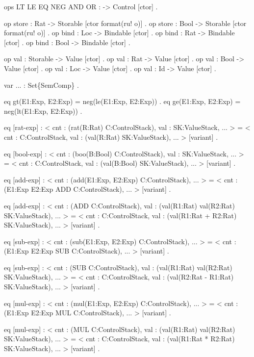 \documentclass{llncs}%
\begin{document}
    ops LT LE EQ NEG AND OR : -> Control [ctor] .

    op store : Rat -> Storable [ctor format(ru! o)] .
    op store : Bool -> Storable [ctor format(ru! o)] .
    op bind : Loc -> Bindable [ctor] .
    op bind : Rat -> Bindable [ctor] .
    op bind : Bool -> Bindable [ctor] .

    op val : Storable -> Value [ctor] .
    op val : Rat -> Value [ctor] .
    op val : Bool -> Value [ctor] .
    op val : Loc -> Value [ctor] .
    op val : Id -> Value [ctor] .

    var ... : Set\{SemComp\} .

    eq gt(E1:Exp, E2:Exp) = neg(le(E1:Exp, E2:Exp)) .
    eq ge(E1:Exp, E2:Exp) = neg(lt(E1:Exp, E2:Exp)) .

    eq [rat-exp] :
        < cnt : (rat(R:Rat) C:ControlStack), val : SK:ValueStack, ... > 
     =
        < cnt : C:ControlStack,
          val : (val(R:Rat) SK:ValueStack), ... > [variant] .

    eq [bool-exp] :
        < cnt : (boo(B:Bool) C:ControlStack), val : SK:ValueStack, ... > 
     =
        < cnt : C:ControlStack,
          val : (val(B:Bool) SK:ValueStack), ... > [variant] .

    eq [add-exp] :
        < cnt : (add(E1:Exp, E2:Exp) C:ControlStack), ... > 
     =
        < cnt : (E1:Exp E2:Exp ADD C:ControlStack), ... > [variant] .

    eq [add-exp] :
        < cnt : (ADD C:ControlStack),
          val : (val(R1:Rat) val(R2:Rat) SK:ValueStack), ... > 
     =
        < cnt : C:ControlStack,
          val : (val(R1:Rat + R2:Rat) SK:ValueStack), ... > [variant] .

    eq [sub-exp] :
        < cnt : (sub(E1:Exp, E2:Exp) C:ControlStack), ... > 
     =
        < cnt : (E1:Exp E2:Exp SUB C:ControlStack), ... > [variant] .

    eq [sub-exp] :
        < cnt : (SUB C:ControlStack),
          val : (val(R1:Rat) val(R2:Rat) SK:ValueStack), ... > 
     =
        < cnt : C:ControlStack,
          val : (val(R2:Rat - R1:Rat) SK:ValueStack), ... > [variant] .

    eq [mul-exp] :
        < cnt : (mul(E1:Exp, E2:Exp) C:ControlStack), ... > 
     =
        < cnt : (E1:Exp E2:Exp MUL C:ControlStack), ... > [variant] .

    eq [mul-exp] :
        < cnt : (MUL C:ControlStack),
          val : (val(R1:Rat) val(R2:Rat) SK:ValueStack), ... > 
     =
        < cnt : C:ControlStack,
          val : (val(R1:Rat * R2:Rat) SK:ValueStack), ... > [variant] .
\end{document}
